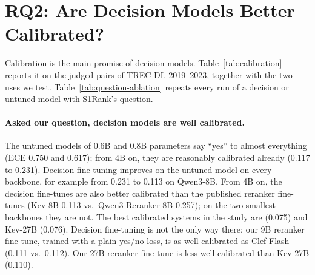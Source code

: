 \section{RQ2: Are Decision Models Better Calibrated?}
\label{sec:calibration}



Calibration is the main promise of decision models. Table~\ref{tab:calibration} reports it on the judged pairs of TREC
DL 2019--2023, together with the two uses we test. Table~\ref{tab:question-ablation} repeats every run of a decision
or untuned model with S1Rank's question.

\paragraph{Asked our question, decision models are well calibrated.}
The untuned models of 0.6B and 0.8B parameters say ``yes'' to almost everything (ECE 0.750 and 0.617); from 4B on,
they are reasonably calibrated already (0.117 to 0.231). Decision fine-tuning improves on the untuned model on every
backbone, for example from 0.231 to 0.113 on Qwen3-8B. From 4B on, the decision fine-tunes are also better calibrated
than the published reranker fine-tunes (Kev-8B 0.113 vs.\ Qwen3-Reranker-8B 0.257); on the two smallest backbones they
are not. The best calibrated systems in the study are \jev{} (0.075) and Kev-27B (0.076). Decision fine-tuning is not
the only way there: our 9B reranker fine-tune, trained with a plain yes/no loss, is as well calibrated as Clef-Flash
(0.111 vs.\ 0.112). Our 27B reranker fine-tune is less well calibrated than Kev-27B (0.110).

